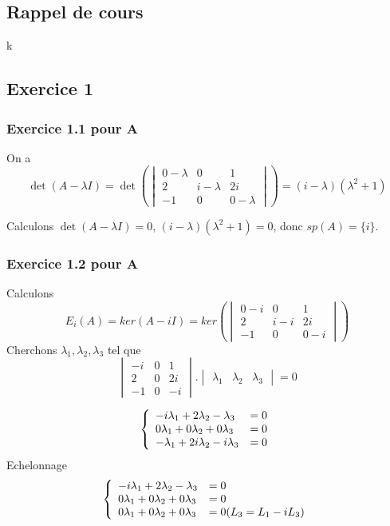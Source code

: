 \documentclass[]{book}
\theoremstyle{definition}
\begin{document}
\subsection*{Rappel de cours}k



\newpage
\subsection*{Exercice 1}
\subsubsection*{Exercice 1.1 pour A}
On a 
$$\det(A -\lambda I) = \det\left(\begin{vmatrix} 0-\lambda & 0 & 1 \\ 2 & i-\lambda & 2i \\ -1 & 0 & 0-\lambda \end{vmatrix}\right) = (i-\lambda)(\lambda^2+1)$$

Calculons $\det(A -\lambda I) = 0$, $(i-\lambda)(\lambda^2+1)=0$, donc $sp(A)=\{i\}$. 

\subsubsection*{Exercice 1.2 pour A}
Calculons
$$E_{i}(A) = ker(A -iI) = ker\left(\begin{vmatrix} 0-i & 0 & 1 \\ 2 & i-i & 2i \\ -1 & 0 & 0-i \end{vmatrix}\right)$$
Cherchons $\lambda_1,\lambda_2,\lambda_3$  tel que
$$\begin{vmatrix} -i & 0 & 1 \\ 2 & 0 & 2i \\ -1 & 0 & -i \end{vmatrix}.\begin{vmatrix} \lambda_1 & \lambda_2 & \lambda_3 \end{vmatrix} = 0$$

$$
\left\{ 
\begin{array}{l l}
-i\lambda_{1} + 2\lambda_{2} -\lambda_{3} & = 0\\
0\lambda_{1} + 0\lambda_{2} + 0\lambda_{3} & = 0\\
-\lambda_{1} + 2i\lambda_{2} -i \lambda_{3} & = 0\\
\end{array}
\right. 
$$ 
Echelonnage
$$
\left\{ 
\begin{array}{l l}
-i\lambda_{1} + 2\lambda_{2} -\lambda_{3} & = 0\\
0\lambda_{1} + 0\lambda_{2} + 0\lambda_{3} & = 0\\
0\lambda_{1} + 0\lambda_{2} + 0\lambda_{3} & = 0  (L_3=L_1-iL_3)\\
\end{array}
\right. 
$$ 
\end{document}
